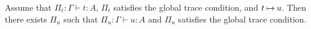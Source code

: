 \begin{theorem}
\label{theorem-subject-reduction}
  Assume that $\Pi_t:\Gamma\vdash t:A$, $\Pi_t$ satisfies the global trace condition, and $t\mathbin{\mapsto} u$.
  Then there exists $\Pi_u$ such that $\Pi_u:\Gamma\vdash u:A$ and $\Pi_u$ satisfies the global trace condition. 
\end{theorem}


